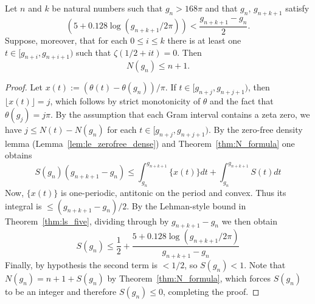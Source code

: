 \begin{theorem}
\label{thm:n_upper_bound}
\leanok
Let $n$ and $k$ be natural numbers such that $g_n>168\pi$ and
that $g_n$, $g_{n + k + 1}$ satisfy
\[
  (5 + 0.128\log(g_{n + k + 1} / 2\pi)) < \frac{g_{n + k + 1} - g_n}{2}.
\]
Suppose, moreover, that for each $0\leq i \leq k$ there is at least one
$t\in[g_{n + i}, g_{n + i + 1})$ such that $\zeta(1/2 + it) = 0$.
Then 
\[
  N(g_n) \leq n + 1.
\]
\end{theorem}
\begin{proof}
\leanok
{}
Let $x(t) := (\theta(t) - \theta(g_n)) / \pi$. 
If $t \in [g_{n + j}, g_{n + j + 1})$, then $\lfloor x(t)\rfloor = j$, 
which follows by strict monotonicity of $\theta$ and the fact that 
$\theta(g_j) = j\pi$. 
By the assumption that each Gram interval contains a zeta zero, we have 
$j \leq N(t) - N(g_n)$ for each $t \in [g_{n + j}, g_{n + j + 1})$.
By the zero-free density lemma (Lemma~\ref{lem:le_zerofree_dense}) and 
Theorem~\ref{thm:N_formula} one obtains 
\[
  S(g_n)(g_{n + k + 1} - g_n) \leq \int_{g_n}^{g_{n + k + 1}} \{x(t)\}dt + \int_{g_n}^{g_{n + k + 1}} S(t)dt
\]
Now, $\{x(t)\}$ is one-periodic, antitonic on the period and convex.
Thus its integral is $\leq (g_{n + k + 1} - g_n) / 2$.
By the Lehman-style bound in Theorem~\ref{thm:ls_five}, dividing through by $g_{n + k + 1} - g_n$ we then obtain
\[
  S(g_n) \leq \frac{1}{2} + \frac{5 + 0.128\log(g_{n + k + 1} / 2\pi)}{g_{n + k + 1} - g_n}
\]
Finally, by hypothesis the second term is $< 1/2$, so $S(g_n) < 1$.
Note that $N(g_n) = n + 1 + S(g_n)$ by Theorem~\ref{thm:N_formula}, which 
forces $S(g_n)$ to be an integer and therefore $S(g_n)\leq 0$, 
completing the proof.
\end{proof}


